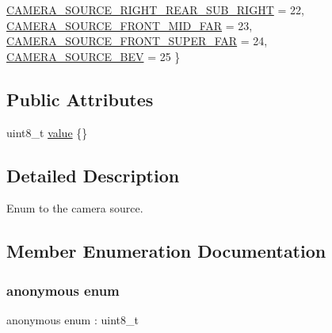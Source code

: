 \begin{DoxyCompactItemize}
\hyperlink{structmaf__perception__interface_1_1CameraSourceEnum_a50ff50b7fad90eab9dabdd749889ab67a8d05abc41028213989d040a905bda2df}{C\+A\+M\+E\+R\+A\+\_\+\+S\+O\+U\+R\+C\+E\+\_\+\+R\+I\+G\+H\+T\+\_\+\+R\+E\+A\+R\+\_\+\+S\+U\+B\+\_\+\+R\+I\+G\+HT} = 22, 
\hyperlink{structmaf__perception__interface_1_1CameraSourceEnum_a50ff50b7fad90eab9dabdd749889ab67aa7abde73bcc40700a37e23611efcbc65}{C\+A\+M\+E\+R\+A\+\_\+\+S\+O\+U\+R\+C\+E\+\_\+\+F\+R\+O\+N\+T\+\_\+\+M\+I\+D\+\_\+\+F\+AR} = 23, 
\newline
\hyperlink{structmaf__perception__interface_1_1CameraSourceEnum_a50ff50b7fad90eab9dabdd749889ab67addc332bdc8098a9b947ead0242f08bf0}{C\+A\+M\+E\+R\+A\+\_\+\+S\+O\+U\+R\+C\+E\+\_\+\+F\+R\+O\+N\+T\+\_\+\+S\+U\+P\+E\+R\+\_\+\+F\+AR} = 24, 
\hyperlink{structmaf__perception__interface_1_1CameraSourceEnum_a50ff50b7fad90eab9dabdd749889ab67a7a6a8c951c000a54139b5ac340d0c9c5}{C\+A\+M\+E\+R\+A\+\_\+\+S\+O\+U\+R\+C\+E\+\_\+\+B\+EV} = 25
 \}
\end{DoxyCompactItemize}
\subsection*{Public Attributes}
\begin{DoxyCompactItemize}
\item 
uint8\+\_\+t \hyperlink{structmaf__perception__interface_1_1CameraSourceEnum_a363bc43f622e3b5fa73e9f5b30f0737c}{value} \{\}
\end{DoxyCompactItemize}


\subsection{Detailed Description}
Enum to the camera source. 

\subsection{Member Enumeration Documentation}
\mbox{\label{structmaf__perception__interface_1_1CameraSourceEnum_a50ff50b7fad90eab9dabdd749889ab67}} 
\subsubsection{\texorpdfstring{anonymous enum}{anonymous enum}}
{\footnotesize\ttfamily anonymous enum \+: uint8\+\_\+t}

